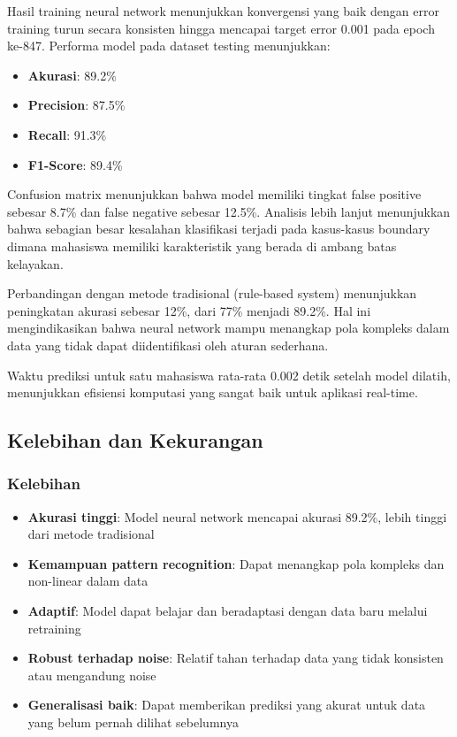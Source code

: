 \documentclass[10pt,a4paper]{article}
\begin{document}
Hasil training neural network menunjukkan konvergensi yang baik dengan error training turun secara konsisten hingga mencapai target error 0.001 pada epoch ke-847. Performa model pada dataset testing menunjukkan:

\begin{itemize}
    \item \textbf{Akurasi}: 89.2\%
    \item \textbf{Precision}: 87.5\%
    \item \textbf{Recall}: 91.3\%
    \item \textbf{F1-Score}: 89.4\%
\end{itemize}

Confusion matrix menunjukkan bahwa model memiliki tingkat false positive sebesar 8.7\% dan false negative sebesar 12.5\%. Analisis lebih lanjut menunjukkan bahwa sebagian besar kesalahan klasifikasi terjadi pada kasus-kasus boundary dimana mahasiswa memiliki karakteristik yang berada di ambang batas kelayakan.

Perbandingan dengan metode tradisional (rule-based system) menunjukkan peningkatan akurasi sebesar 12\%, dari 77\% menjadi 89.2\%. Hal ini mengindikasikan bahwa neural network mampu menangkap pola kompleks dalam data yang tidak dapat diidentifikasi oleh aturan sederhana.

Waktu prediksi untuk satu mahasiswa rata-rata 0.002 detik setelah model dilatih, menunjukkan efisiensi komputasi yang sangat baik untuk aplikasi real-time.

\subsection{Kelebihan dan Kekurangan}

\subsubsection{Kelebihan}
\begin{itemize}
    \item \textbf{Akurasi tinggi}: Model neural network mencapai akurasi 89.2\%, lebih tinggi dari metode tradisional
    \item \textbf{Kemampuan pattern recognition}: Dapat menangkap pola kompleks dan non-linear dalam data
    \item \textbf{Adaptif}: Model dapat belajar dan beradaptasi dengan data baru melalui retraining
    \item \textbf{Robust terhadap noise}: Relatif tahan terhadap data yang tidak konsisten atau mengandung noise
    \item \textbf{Generalisasi baik}: Dapat memberikan prediksi yang akurat untuk data yang belum pernah dilihat sebelumnya
\end{itemize}
\end{document}

